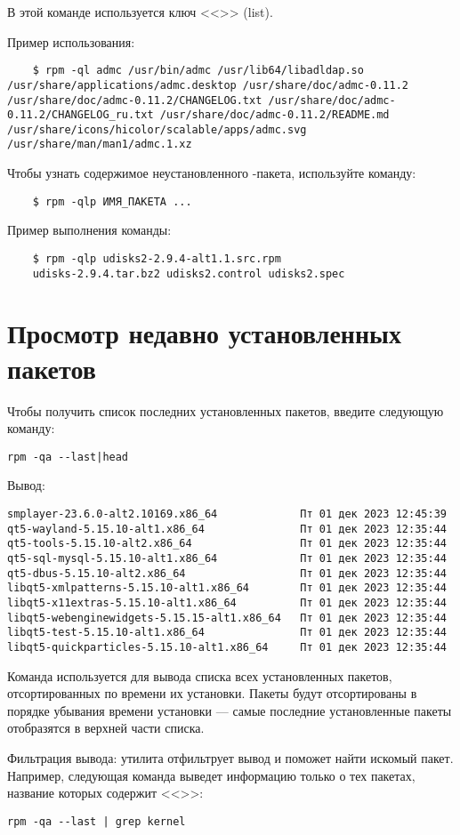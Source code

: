 В этой команде используется ключ <<>> (list).


Пример использования:
\begin{verbatim}
	$ rpm -ql admc /usr/bin/admc /usr/lib64/libadldap.so /usr/share/applications/admc.desktop /usr/share/doc/admc-0.11.2 /usr/share/doc/admc-0.11.2/CHANGELOG.txt /usr/share/doc/admc-0.11.2/CHANGELOG_ru.txt /usr/share/doc/admc-0.11.2/README.md /usr/share/icons/hicolor/scalable/apps/admc.svg /usr/share/man/man1/admc.1.xz
\end{verbatim}

Чтобы узнать содержимое неустановленного -пакета, используйте команду:
\begin{verbatim}
	$ rpm -qlp ИМЯ_ПАКЕТА ...
\end{verbatim}

Пример выполнения команды:
\begin{verbatim}
	$ rpm -qlp udisks2-2.9.4-alt1.1.src.rpm
	udisks-2.9.4.tar.bz2 udisks2.control udisks2.spec 
\end{verbatim}

\section{Просмотр недавно установленных пакетов}\label{view-recently-installed-packages}
Чтобы получить список последних установленных пакетов, введите следующую команду: 

\begin{verbatim}
rpm -qa --last|head	
\end{verbatim}

Вывод:
\begin{verbatim}
smplayer-23.6.0-alt2.10169.x86_64             Пт 01 дек 2023 12:45:39
qt5-wayland-5.15.10-alt1.x86_64               Пт 01 дек 2023 12:35:44
qt5-tools-5.15.10-alt2.x86_64                 Пт 01 дек 2023 12:35:44
qt5-sql-mysql-5.15.10-alt1.x86_64             Пт 01 дек 2023 12:35:44
qt5-dbus-5.15.10-alt2.x86_64                  Пт 01 дек 2023 12:35:44
libqt5-xmlpatterns-5.15.10-alt1.x86_64        Пт 01 дек 2023 12:35:44
libqt5-x11extras-5.15.10-alt1.x86_64          Пт 01 дек 2023 12:35:44
libqt5-webenginewidgets-5.15.15-alt1.x86_64   Пт 01 дек 2023 12:35:44
libqt5-test-5.15.10-alt1.x86_64               Пт 01 дек 2023 12:35:44
libqt5-quickparticles-5.15.10-alt1.x86_64     Пт 01 дек 2023 12:35:44
\end{verbatim}

Команда  используется для вывода списка всех установленных пакетов, отсортированных 
по времени их установки. Пакеты будут отсортированы в порядке убывания времени установки --- самые 
последние установленные пакеты отобразятся в верхней части списка.

Фильтрация вывода: утилита  отфильтрует вывод и поможет найти искомый пакет. Например, 
следующая команда выведет информацию только о тех пакетах, название которых содержит <<>>:

\begin{verbatim}
rpm -qa --last | grep kernel
\end{verbatim} 
